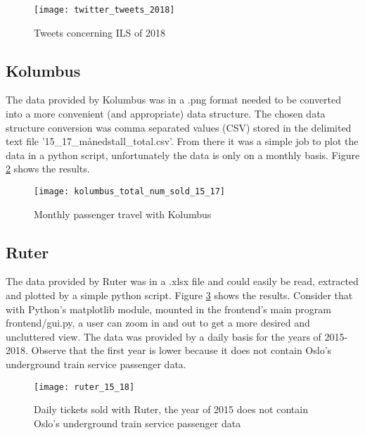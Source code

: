 \begin{figure}[ht]
\texttt{[image: twitter\_tweets\_2018]}
\centering
\caption{Tweets concerning ILS of 2018}
\label{fig:twitterAnal}
\end{figure}

\newpage







\subsection{Kolumbus}
The data provided by Kolumbus was in a .png format needed to be converted into a more convenient (and appropriate) data structure. The chosen data structure conversion was comma separated values (CSV) stored in the delimited text file '15\_17\_månedstall\_total.csv'. From there it was a simple job to plot the data in a python script, unfortunately the data is only on a monthly basis. Figure \ref{fig:kolumbus_15_17} shows the results.

\begin{figure}[!htb]
\texttt{[image: kolumbus\_total\_num\_sold\_15\_17]}
\centering
\caption{Monthly passenger travel with Kolumbus}
\label{fig:kolumbus_15_17}
\end{figure}







\subsection{Ruter}
The data provided by Ruter was in a .xlsx file and could easily be read, extracted and plotted by a simple python script. Figure \ref{fig:ruter_15_18} shows the results. Consider that with Python's matplotlib module, mounted in the frontend's main program frontend/gui.py, a user can zoom in and out to get a more desired and uncluttered view. The data was provided by a daily basis for the years of 2015-2018. Observe that the first year is lower because it does not contain Oslo's underground train service passenger data.

\begin{figure}[!htb]
\texttt{[image: ruter\_15\_18]}
\centering
\caption{Daily tickets sold with Ruter, the year of 2015 does not contain Oslo's underground train service passenger data}
\label{fig:ruter_15_18}
\end{figure}


